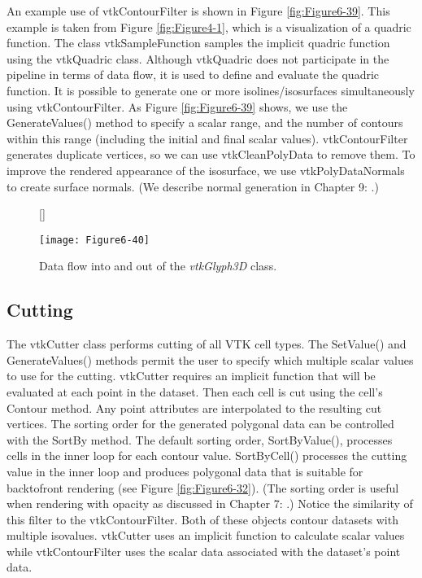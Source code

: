 An example use of vtkContourFilter is shown in Figure \ref{fig:Figure6-39}. This example is taken from Figure \ref{fig:Figure4-1}, which is a visualization of a quadric function. The class vtkSampleFunction samples the implicit quadric function using the vtkQuadric class. Although vtkQuadric does not participate in the pipeline in terms of data flow, it is used to define and evaluate the quadric function. It is possible to generate one or more isolines/isosurfaces simultaneously using vtkContourFilter. As Figure \ref{fig:Figure6-39} shows, we use the GenerateValues() method to specify a scalar range, and the number of contours within this range (including the initial and final scalar values). vtkContourFilter generates duplicate vertices, so we can use vtkCleanPolyData to remove them. To improve the rendered appearance of the isosurface, we use vtkPolyDataNormals to create surface normals. (We describe normal generation in Chapter 9: .)

\begin{figure}[!htb]
	[\FBwidth]
	{\caption{Data flow into and out of the \emph{vtkGlyph3D} class.}\label{fig:Figure6-40}}
	{\texttt{[image: Figure6-40]}}
\end{figure}



\subsection{Cutting}

The vtkCutter class performs cutting of all VTK cell types. The SetValue() and GenerateValues() methods permit the user to specify which multiple scalar values to use for the cutting. vtkCutter requires an implicit function that will be evaluated at each point in the dataset. Then each cell is cut using the cell's Contour method. Any point attributes are interpolated to the resulting cut vertices. The sorting order for the generated polygonal data can be controlled with the SortBy method. The default sorting order, SortByValue(), processes cells in the inner loop for each contour value. SortByCell() processes the cutting value in the inner loop and produces polygonal data that is suitable for backtofront rendering (see Figure \ref{fig:Figure6-32}). (The sorting order is useful when rendering with opacity as discussed in Chapter 7:  .) Notice the similarity of this filter to the vtkContourFilter. Both of these objects contour datasets with multiple isovalues. vtkCutter uses an implicit function to calculate scalar values while vtkContourFilter uses the scalar data associated with the dataset's point data.

